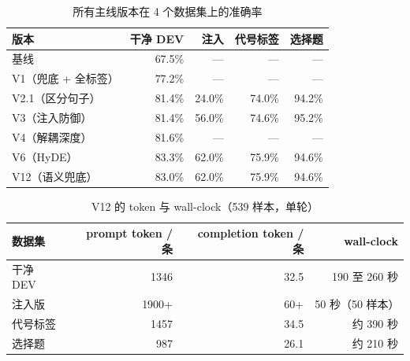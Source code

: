 \documentclass[11pt,a4paper]{article}
\begin{document}
\begin{table}[h]
\centering
\caption{所有主线版本在 4 个数据集上的准确率}
\small
\begin{tabular}{lrrrr}
\toprule
版本 & 干净 DEV & 注入 & 代号标签 & 选择题 \\
\midrule
基线              & 67.5\% & --- & --- & --- \\
V1（兜底 + 全标签）  & 77.2\% & --- & --- & --- \\
V2.1（区分句子）   & 81.4\% & 24.0\% & 74.0\% & 94.2\% \\
V3（注入防御）     & 81.4\% & 56.0\% & 74.6\% & 95.2\% \\
V4（解耦深度）     & 81.6\% & --- & --- & --- \\
V6（HyDE）         & 83.3\% & 62.0\% & 75.9\% & 94.6\% \\
V12（语义兜底）    & 83.0\% & 62.0\% & 75.9\% & 94.6\% \\
\bottomrule
\end{tabular}
\end{table}

\begin{table}[h]
\centering
\caption{V12 的 token 与 wall-clock（539 样本，单轮）}
\small
\begin{tabular}{lrrr}
\toprule
数据集 & prompt token / 条 & completion token / 条 & wall-clock \\
\midrule
干净 DEV   & 1346  & 32.5 & 190 至 260 秒 \\
注入版     & 1900+ & 60+  & 50 秒（50 样本）\\
代号标签   & 1457  & 34.5 & 约 390 秒 \\
选择题     & 987   & 26.1 & 约 210 秒 \\
\bottomrule
\end{tabular}
\end{table}
\end{document}
